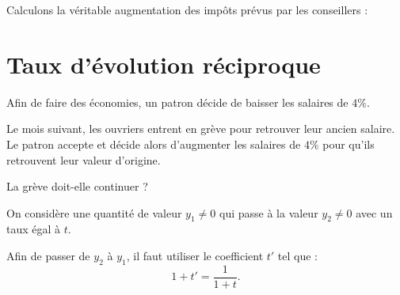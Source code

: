 \documentclass[xcolor={dvipsnames,svgnames,table}]{beamer}
\begin{document}
\begin{frame}
    \begin{Example}
        Calculons la véritable augmentation des impôts prévus par les conseillers :
        
        \rule{0pt}{4cm}
    \end{Example}
\end{frame}

\section{Taux d'évolution réciproque}

\begin{frame}
    \begin{Example}
        Afin de faire des économies, un patron décide de baisser les salaires de $4\%$.\par
        Le mois suivant, les ouvriers entrent en grève pour retrouver leur ancien salaire. Le patron accepte et décide alors d'augmenter les salaires de $4\%$ pour qu'ils retrouvent leur valeur d'origine.\par
        La grève doit-elle continuer ?
    \end{Example}
\end{frame}

\begin{frame}
    \begin{Prop}
        On considère une quantité de valeur $y_1 \neq 0$ qui passe à la valeur $y_2 \neq 0$ avec un taux égal à $t$.\par
        Afin de passer de $y_2$ à $y_1$, il faut utiliser le coefficient $t'$ tel que : \[1 + t' = \frac{1}{1 + t}.\]
    \end{Prop}
\pause
    \begin{Proof}
        \rule{0pt}{3cm}
    \end{Proof}
\end{frame}

\begin{frame}
    \begin{Example}
        \rule{0pt}{6cm}
    \end{Example}
\end{frame}
\end{document}
